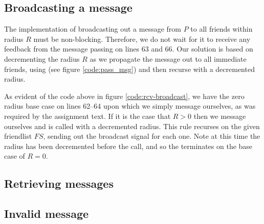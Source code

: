 \subsection{Broadcasting a message}
The implementation of broadcasting out a message from $P$ to all friends
within radius $R$ must be non-blocking. Therefore, we do not wait for it to
receive any feedback from the message passing on lines 63 and 66. Our solution
is based on decrementing the radius $R$ as we propagate the message out to all
immediate friends, using  (see figure \ref{code:pass_msg}) and
then recurse with a decremented radius.


As evident of the code above in figure \ref{code:rcv-broadcast}, we have the
zero radius base case on lines 62--64 upon which we simply message ourselves,
as was required by the assignment text. If it is the case that $R > 0$ then we
message ourselves and  is called with a decremented radius.
This rule recurses on the given friendlist $FS$, sending out the broadcast
signal for each one. Note at this time the radius has been decremented before
the call, and so the terminates on the base case of $R=0$.


\subsection{Retrieving messages}
\subsection{Invalid message}
